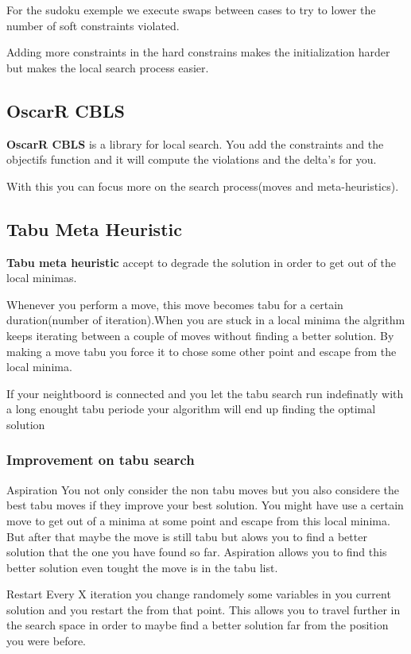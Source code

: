 For the sudoku exemple we execute swaps between cases to try to lower the number of soft constraints violated.

Adding more constraints in the hard constrains makes the initialization harder but makes the local search process easier.

\subsection{OscarR CBLS}
\textbf{OscarR CBLS} is a library for local search.
You add the constraints and the objectifs function and it will compute the violations and the delta's for you.

With this you can focus more on the search process(moves and meta-heuristics).

\subsection{Tabu Meta Heuristic}
\textbf{Tabu meta heuristic} accept to degrade the solution in order to get out of the local minimas.\newline

Whenever you perform a move, this move becomes tabu for a certain duration(number of iteration).When you are stuck in a local minima the algrithm keeps iterating between a couple of moves without finding a better solution. By making a move tabu you force it to chose some other point and escape from the  local minima.\newline

If your neightboord is connected and you let the tabu search run indefinatly with a long enought tabu periode your algorithm will end up finding the optimal solution

\subsubsection{Improvement on tabu search}
Aspiration\newline
You not only consider the non tabu moves but you also considere the best tabu moves if they improve your best solution.
You might have use a certain move to get out of a minima at some point and escape from this local minima. But after that maybe the move is still tabu but alows you to find a better solution that the one you have found so far. Aspiration allows you to find this better solution even tought the move is in the tabu list.

Restart\newline
Every X iteration you change randomely some variables in you current solution and you restart the from that point. This allows you to travel further in the search space in order to maybe find a better solution far from the position you were before.

